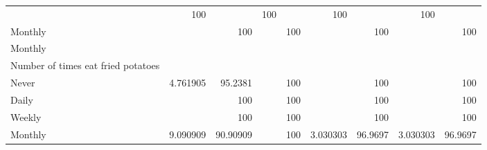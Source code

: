 \documentclass{article}
\begin{document}
\begin{tabular}{lllllllll}
  \multicolumn{1}{|r}{} &
  \multicolumn{1}{r}{100} &
  \multicolumn{1}{r}{} &
  \multicolumn{1}{r}{100} &
  \multicolumn{1}{r}{} &
  \multicolumn{1}{r}{100} &
  \multicolumn{1}{r}{} &
  \multicolumn{1}{r}{100} \\
\multicolumn{1}{l}{\hspace{7em}Monthly} &
  \multicolumn{1}{|r}{} &
  \multicolumn{1}{r}{100} &
  \multicolumn{1}{r}{} &
  \multicolumn{1}{r}{100} &
  \multicolumn{1}{r}{} &
  \multicolumn{1}{r}{100} &
  \multicolumn{1}{r}{} &
  \multicolumn{1}{r}{100} \\
\multicolumn{1}{l}{\hspace{5em}Monthly} &
  \multicolumn{1}{|r}{} &
  \multicolumn{1}{r}{} &
  \multicolumn{1}{r}{} &
  \multicolumn{1}{r}{} &
  \multicolumn{1}{r}{} &
  \multicolumn{1}{r}{} &
  \multicolumn{1}{r}{} &
  \multicolumn{1}{r}{} \\
\multicolumn{1}{l}{\hspace{6em}Number of times eat fried potatoes} &
  \multicolumn{1}{|r}{} &
  \multicolumn{1}{r}{} &
  \multicolumn{1}{r}{} &
  \multicolumn{1}{r}{} &
  \multicolumn{1}{r}{} &
  \multicolumn{1}{r}{} &
  \multicolumn{1}{r}{} &
  \multicolumn{1}{r}{} \\
\multicolumn{1}{l}{\hspace{7em}Never} &
  \multicolumn{1}{|r}{4.761905} &
  \multicolumn{1}{r}{95.2381} &
  \multicolumn{1}{r}{} &
  \multicolumn{1}{r}{100} &
  \multicolumn{1}{r}{} &
  \multicolumn{1}{r}{100} &
  \multicolumn{1}{r}{} &
  \multicolumn{1}{r}{100} \\
\multicolumn{1}{l}{\hspace{7em}Daily} &
  \multicolumn{1}{|r}{} &
  \multicolumn{1}{r}{100} &
  \multicolumn{1}{r}{} &
  \multicolumn{1}{r}{100} &
  \multicolumn{1}{r}{} &
  \multicolumn{1}{r}{100} &
  \multicolumn{1}{r}{} &
  \multicolumn{1}{r}{100} \\
\multicolumn{1}{l}{\hspace{7em}Weekly} &
  \multicolumn{1}{|r}{} &
  \multicolumn{1}{r}{100} &
  \multicolumn{1}{r}{} &
  \multicolumn{1}{r}{100} &
  \multicolumn{1}{r}{} &
  \multicolumn{1}{r}{100} &
  \multicolumn{1}{r}{} &
  \multicolumn{1}{r}{100} \\
\multicolumn{1}{l}{\hspace{7em}Monthly} &
  \multicolumn{1}{|r}{9.090909} &
  \multicolumn{1}{r}{90.90909} &
  \multicolumn{1}{r}{} &
  \multicolumn{1}{r}{100} &
  \multicolumn{1}{r}{3.030303} &
  \multicolumn{1}{r}{96.9697} &
  \multicolumn{1}{r}{3.030303} &
  \multicolumn{1}{r}{96.9697} \\

\end{tabular}
\end{document}
